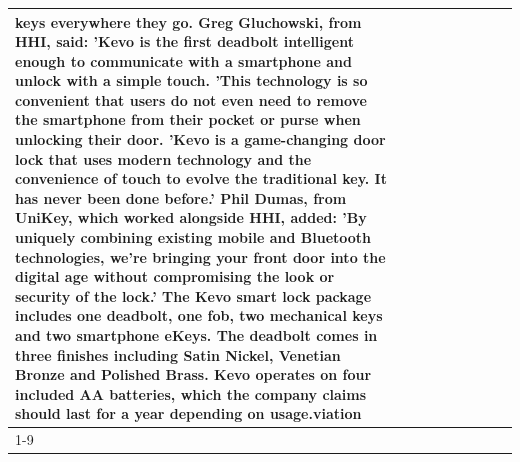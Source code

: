 \begin{table}[H]
\begin{tabular}{lllrlllll}
keys everywhere they go. Greg Gluchowski, from HHI, said: 'Kevo is the first deadbolt intelligent enough to communicate with a smartphone and unlock with a simple touch. 'This technology is so convenient that users do not even need to remove the smartphone from their pocket or purse when unlocking their door. 'Kevo is a game-changing door lock that uses modern technology and the convenience of touch to evolve the traditional key. It has never been done before.' Phil Dumas, from UniKey, which worked alongside HHI, added: 'By uniquely combining existing mobile and Bluetooth technologies, we’re bringing your front door into the digital age without compromising the look or security of the lock.' The Kevo smart lock package includes one deadbolt, one fob, two mechanical keys and two smartphone eKeys. The deadbolt comes in three finishes including Satin Nickel, Venetian Bronze and Polished Brass. Kevo operates on four included AA batteries, which the company claims should last for a year depending on usage.viation \\
\cline{1-9}

\end{tabular}
\end{table}
